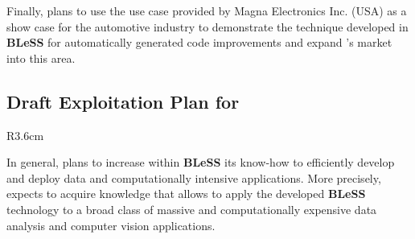 \documentclass[a4paper,11pt]{article}
\newcommand{\project}[1]{\textbf{#1}\xspace}
\newcommand{\BLESS}{\project{BLeSS}}
\newcommand{\TheProject}{\BLESS}
\begin{document}
Finally, \PRshort{} plans to use the use case provided by Magna Electronics Inc. (USA) as a show case for
the automotive industry to demonstrate the technique developed in \TheProject{} for automatically generated code improvements and expand \PRshort{}'s market into this area. 


\horizontalline

\subsection*{Draft Exploitation Plan for \SCCHshort{}}
\vspace{-6pt}

\begin{wrapfigure}{R}{3.6cm}
\vspace{-1.3cm}
\hfill {}
\vspace{-0.8cm}
\end{wrapfigure}

In general, \SCCHshort{} plans to increase within \TheProject{} its know-how to efficiently develop and deploy data and
computationally intensive applications. More precisely, \SCCHshort{} expects to acquire knowledge that allows to apply
the developed \TheProject{} technology to a broad class of massive and computationally expensive data analysis and
computer vision applications.

\end{document}
